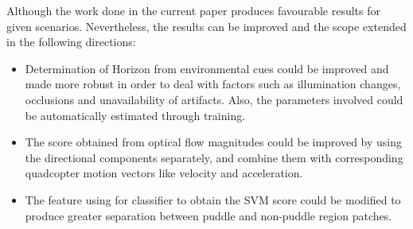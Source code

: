 \documentclass[times,10pt,twocolumn,letterpaper]{article}
\begin{document}
Although the work done in the current paper produces favourable results for
given scenarios. Nevertheless, the results can be improved and the scope
extended in the following directions:
\begin{itemize}
  \item Determination of Horizon from environmental cues could be improved and made
  more robust in order to deal with factors such as illumination changes,
  occlusions and unavailability of artifacts. Also, the parameters involved
  could be automatically estimated through training.
  \item The score obtained from optical flow magnitudes could be improved by
  using the directional components separately, and combine them with
  corresponding quadcopter motion vectors like velocity and acceleration.
  \item The feature using for classifier to obtain the SVM score could be
  modified to produce greater separation between puddle and non-puddle region
  patches.
\end{itemize}



\end{document}
